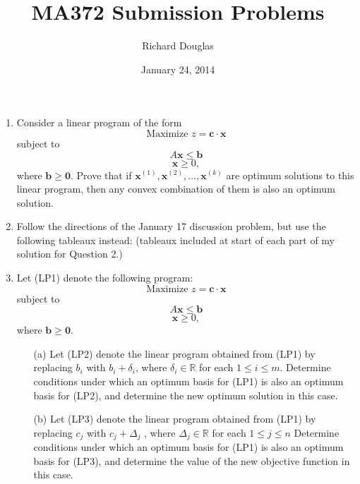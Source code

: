 \documentclass{article}[12pt,a4paper]
\title{MA372 Submission Problems}
\author{Richard Douglas}
\date{January 24,  2014} %
\begin{document}
  \maketitle
  \begin{enumerate}
  	\item Consider a linear program of the form
	        $$\mbox{Maximize } z = \mathbf{c} \cdot \mathbf{x}$$
                    subject to
	        $$A\mathbf{x} \le \mathbf{b}$$
	        $$\mathbf{x} \ge 0,$$
	       where $\mathbf{b} \ge \mathbf{0}$. Prove that if $\mathbf{x}^{(1)} ,\mathbf{x}^{(2)} , \dots ,\mathbf{x}^{(k)}$ 	
	       are optimum solutions to this linear program, then any convex combination of them is also an optimum solution.
	       \newline
	       
	\item Follow the directions of the January 17 discussion problem, but use the following tableaux instead:
		(tableaux included at start of each part of my solution for Question 2.)
		\newline
	
	\item Let (LP1) denote the following program:
	        $$\mbox{Maximize } z = \mathbf{c} \cdot \mathbf{x}$$
	        subject to
	        $$A\mathbf{x} \le \mathbf{b}$$
	        $$\mathbf{x} \ge 0,$$
	         where $\mathbf{b} \ge \mathbf{0}$.
	         \begin{enumerate}
	         \item[(a)] Let (LP2) denote the linear program obtained from (LP1) by replacing $b_i$ with
		$b_i + \delta_i$, where $\delta_i \in \mathbb{R}$ for each $1 \le i \le m$. Determine conditions 
		under which an optimum basis for (LP1) is also an optimum basis for (LP2), and 	
		determine the new optimum solution in this case.
		
		\item[(b)] Let (LP3) denote the linear program obtained from (LP1) by replacing $c_j$ with
		$c_j + \Delta_j$ , where $\Delta_j \in \mathbb{R}$ for each $1 \le j \le n$
		Determine conditions under which an optimum basis for (LP1) is also an optimum basis for (LP3), 
		and determine the value of the new objective function in this case.
	         \end{enumerate}
  \end{enumerate}
  
\end{document}
